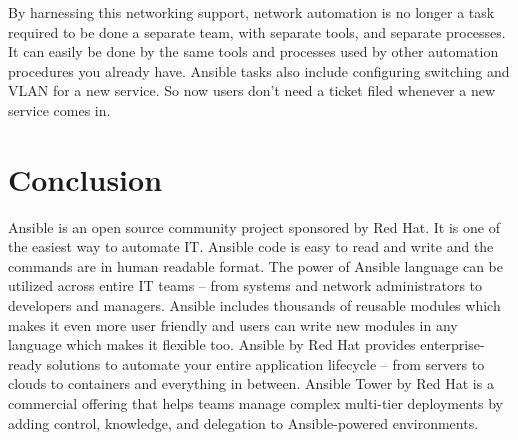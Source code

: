 \documentclass[9pt,twocolumn,twoside]{styles/osajnl}
\begin{document}
By harnessing this networking support, network automation is no longer
a task required to be done a separate team, with separate tools, and
separate processes. It can easily be done by the same tools and
processes used by other automation procedures you already
have. Ansible tasks also include configuring switching and VLAN for a
new service. So now users don't need a ticket filed whenever a new
service comes in.

\section{Conclusion}

Ansible is an open source community project sponsored by Red Hat. It
is one of the easiest way to automate IT. Ansible code is easy to read
and write and the commands are in human readable format. The power of
Ansible language can be utilized across entire IT teams – from systems
and network administrators to developers and managers. Ansible
includes thousands of reusable modules which makes it even more user
friendly and users can write new modules in any language which makes
it flexible too. Ansible by Red Hat provides enterprise-ready
solutions to automate your entire application lifecycle – from servers
to clouds to containers and everything in between. Ansible Tower by
Red Hat is a commercial offering that helps teams manage complex
multi-tier deployments by adding control, knowledge, and delegation to
Ansible-powered environments.



 
\end{document}
